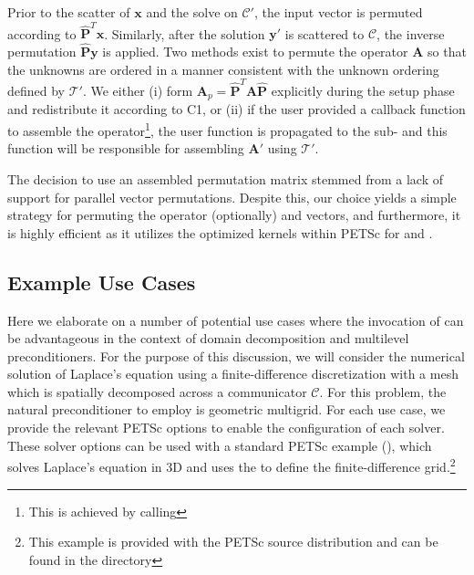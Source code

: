 \documentclass[]{siamart0216}
\newcommand{\dmat}[1]{\mathbf{#1}}
\newcommand{\dvec}[1]{\mathbf{#1}}
\begin{document}
\begin{itemize}
	Prior to the scatter of $\dvec x$ and the solve on $\mathcal C'$, the input vector is permuted according to $\hat{\dmat P}^T \dvec x$. 
	Similarly, after the solution $\dvec y'$ is scattered to $\mathcal C$, the inverse permutation $\hat{\dmat P} \dvec y$ is applied.
	Two methods exist to permute the operator $\dmat A$ so that the unknowns are ordered in a manner consistent with the  
	unknown ordering defined by $\mathcal T'$. We either (i) form 
	$\dmat A_p = \hat{\dmat P}^T \dmat A \hat{\dmat P}$ explicitly during the setup phase and redistribute it according to C1, 
	or (ii) if the user provided a callback function to assemble the operator\footnote{This is achieved by calling }, the user function is
	propagated to the sub- and this function will be responsible for assembling $\dmat A'$ using $\mathcal T'$.	
	


	The decision to use an assembled permutation matrix stemmed from a lack of support for parallel vector permutations.
	Despite this, our choice yields a simple strategy for permuting the operator (optionally) and vectors, and furthermore, it is highly 
	efficient as it utilizes the optimized kernels within PETSc for  and .
\end{itemize}


\subsection{Example Use Cases} \label{sec:usecases}
Here we elaborate on a number of potential use cases where the invocation of  
can be advantageous in the context of domain decomposition and multilevel preconditioners.
For the purpose of this discussion, we will consider the numerical solution of Laplace's equation 
using a finite-difference discretization with a mesh which is spatially decomposed 
across a communicator $\mathcal C$. 
For this problem, the natural preconditioner to employ is geometric multigrid. 
For each use case, we provide the relevant PETSc options to enable the configuration of each solver.
These solver options can be used with a standard PETSc example (), which solves 
Laplace's equation in 3D and uses the  to define the finite-difference grid.\footnote{
This example is provided with the PETSc source distribution and can be found  in the directory }
\end{document}
